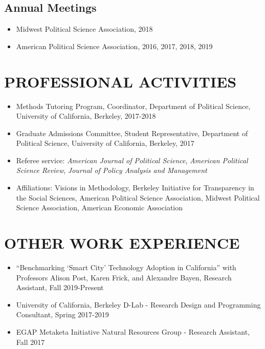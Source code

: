 \documentclass[11pt]{article}
\begin{document}
\subsection*{Annual Meetings}

\begin{itemize}[nosep]
\item[]Midwest Political Science Association, 2018
	\item[]American Political Science Association, 2016, 2017, 2018, 2019 	
	
	
\end{itemize}

\vspace{3mm}
\section*{PROFESSIONAL ACTIVITIES}


\begin{itemize}	

\item[]Methods Tutoring Program, Coordinator, Department of Political Science, University of California, Berkeley, 2017-2018
\item[]Graduate Admissions Committee, Student Representative, Department of Political Science, University of California, Berkeley, 2017
\item[]Referee service: \textit{American Journal of Political Science}, \textit{American Political Science Review}, \textit{Journal of Policy Analysis and Management}
\item[]Affiliations: Visions in Methodology, Berkeley Initiative for Transparency in the Social Sciences, American Political Science Association, Midwest Political Science Association, American Economic Association
\end{itemize}


\vspace{3mm}
\section*{OTHER WORK EXPERIENCE}
	\begin{itemize}
	\item[]``Benchmarking `Smart City' Technology Adoption in California'' with Professors Alison Post, Karen Frick, and Alexandre Bayen, Research Assistant, Fall 2019-Present
	\item[]University of California, Berkeley D-Lab - Research Design and Programming Consultant, Spring 2017-2019
	\item[]EGAP Metaketa Initiative Natural Resources Group - Research Assistant, Fall 2017
\end{itemize}
\end{document}
